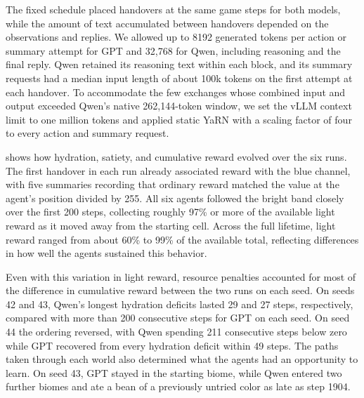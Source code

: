 \documentclass[10pt,journal,compsoc]{IEEEtran}
\newif\ifincludepilotprompts
\begin{document}
The fixed schedule placed handovers at the same game steps for both models, while the amount of text accumulated between handovers depended on the observations and replies.
We allowed up to 8192 generated tokens per action or summary attempt for GPT and 32,768 for Qwen, including reasoning and the final reply.
Qwen retained its reasoning text within each block, and its summary requests had a median input length of about 100k tokens on the first attempt at each handover.
To accommodate the few exchanges whose combined input and output exceeded Qwen's native 262,144-token window, we set the vLLM context limit to one million tokens and applied static YaRN \cite{peng2024} with a scaling factor of four to every action and summary request.
\ifincludepilotprompts
    Appendix~\ref{app:pilot-prompts} reproduces the prompts and gives the request protocol and inference settings.
\fi

 shows how hydration, satiety, and cumulative reward evolved over the six runs.
The first handover in each run already associated reward with the blue channel, with five summaries recording that ordinary reward matched the value at the agent's position divided by 255.
All six agents followed the bright band closely over the first 200 steps, collecting roughly 97\% or more of the available light reward as it moved away from the starting cell.
Across the full lifetime, light reward ranged from about 60\% to 99\% of the available total, reflecting differences in how well the agents sustained this behavior.

Even with this variation in light reward, resource penalties accounted for most of the difference in cumulative reward between the two runs on each seed.
On seeds 42 and 43, Qwen's longest hydration deficits lasted 29 and 27 steps, respectively, compared with more than 200 consecutive steps for GPT on each seed.
On seed 44 the ordering reversed, with Qwen spending 211 consecutive steps below zero while GPT recovered from every hydration deficit within 49 steps.
The paths taken through each world also determined what the agents had an opportunity to learn.
On seed 43, GPT stayed in the starting biome, while Qwen entered two further biomes and ate a bean of a previously untried color as late as step 1904.
\end{document}
